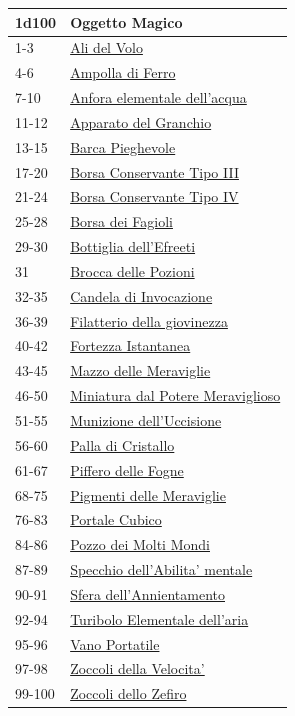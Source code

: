 \begin{multicols}{2}
{{\small\begin{tabularx}{0.45\textwidth}{lX}
		\toprule
\textbf{1d100} & \textbf{Oggetto Magico}\\
\toprule
1-3 & \hyperlink{Ali del Volo}{Ali del Volo}\\
4-6 & \hyperlink{Ampolla di Ferro}{Ampolla di Ferro}\\
7-10 & \hyperlink{Anfora elementale dell'acqua}{Anfora elementale dell'acqua}\\
11-12 & \hyperlink{Apparato del Granchio}{Apparato del Granchio}\\
13-15 & \hyperlink{Barca Pieghevole}{Barca Pieghevole}\\
17-20 & \hyperlink{Borsa Conservante Tipo III}{Borsa Conservante Tipo III}\\
21-24 & \hyperlink{Borsa Conservante Tipo IV}{Borsa Conservante Tipo IV}\\
25-28 & \hyperlink{Borsa dei Fagioli}{Borsa dei Fagioli}\\
29-30 & \hyperlink{Bottiglia dell'Efreeti}{Bottiglia dell'Efreeti}\\
31 & \hyperlink{Brocca delle Pozioni}{Brocca delle Pozioni}\\
32-35 & \hyperlink{Candela di Invocazione}{Candela di Invocazione}\\
36-39 & \hyperlink{Filatterio della giovinezza}{Filatterio della giovinezza}\\
40-42 & \hyperlink{Fortezza Istantanea}{Fortezza Istantanea}\\
43-45 & \hyperlink{Mazzo delle Meraviglie}{Mazzo delle Meraviglie}\\
46-50 & \hyperlink{Miniatura dal Potere Meraviglioso}{Miniatura dal Potere Meraviglioso}\\
51-55 & \hyperlink{Munizione dell'Uccisione}{Munizione dell'Uccisione}\\
56-60 & \hyperlink{Palla di Cristallo}{Palla di Cristallo}\\
61-67 & \hyperlink{Piffero delle Fogne}{Piffero delle Fogne}\\
68-75 & \hyperlink{Pigmenti delle Meraviglie}{Pigmenti delle Meraviglie}\\
76-83 & \hyperlink{Portale Cubico}{Portale Cubico}\\
84-86 & \hyperlink{Pozzo dei Molti Mondi}{Pozzo dei Molti Mondi}\\
87-89 & \hyperlink{Specchio dell'Abilita' mentale}{Specchio dell'Abilita' mentale}\\
90-91 & \hyperlink{Sfera dell'Annientamento}{Sfera dell'Annientamento}\\
92-94 & \hyperlink{Turibolo Elementale dell'aria}{Turibolo Elementale dell'aria}\\
95-96 & \hyperlink{Vano Portatile}{Vano Portatile}\\
97-98 & \hyperlink{Zoccoli della Velocita'}{Zoccoli della Velocita'}\\
99-100 & \hyperlink{Zoccoli dello Zefiro}{Zoccoli dello Zefiro}
\end{tabularx}}

}
\end{multicols}
